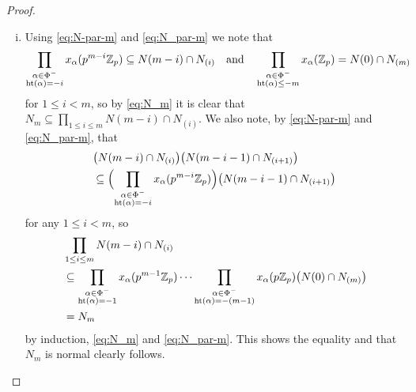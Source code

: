 \begin{proof}
  \begin{enumerate}[(i),wide]
  \item Using \eqref{eq:N-par-m} and \eqref{eq:N_par-m} we note that
    \begin{equation*}
      \prod_{\substack{\alpha\in \Phi^{-} \\ \operatorname{ht}(\alpha) = -i}} x_\alpha(p^{m-i} \mathbb{Z}_p) \subseteq N(m-i) \cap N_{(i)} \quad \text{and} \quad \prod_{\substack{\alpha\in \Phi^{-} \\ \operatorname{ht}(\alpha) \leq -m}} x_\alpha(\mathbb{Z}_p) = N(0) \cap N_{(m)}
    \end{equation*}
    for $1 \leq i < m$, so by \eqref{eq:N_m} it is clear that $N_m \subseteq \prod_{1 \leq i \leq m} N(m-i) \cap N_{(i)}$. We also note, by \eqref{eq:N-par-m} and \eqref{eq:N_par-m}, that
    \begin{align*}
      &\bigl( N(m-i) \cap N_{(i)} \bigr)\bigl( N(m-i-1) \cap N_{(i+1)} \bigr) \\
      &\subseteq \Bigl( \prod_{\substack{\alpha\in \Phi^{-} \\ \operatorname{ht}(\alpha) = -i}} x_\alpha(p^{m-i} \mathbb{Z}_p) \Bigr)\bigl( N(m-i-1) \cap N_{(i+1)} \bigr)
    \end{align*}
    for any $1 \leq i < m$, so
    \begin{align*}
      &\prod_{1 \leq i \leq m} N(m-i) \cap N_{(i)} \\
      &\subseteq \prod_{\substack{\alpha\in \Phi^{-} \\ \operatorname{ht}(\alpha) = -1}} x_\alpha(p^{m-1} \mathbb{Z}_p) \dotsb \prod_{\substack{\alpha\in \Phi^{-} \\ \operatorname{ht}(\alpha) = -(m-1)}} x_\alpha(p \mathbb{Z}_p) \bigl( N(0) \cap N_{(m)} \bigr) \\
      &= N_m
    \end{align*}
    by induction, \eqref{eq:N_m} and \eqref{eq:N_par-m}. This shows the equality and that $N_m$ is normal clearly follows.


\end{enumerate}
\end{proof}
